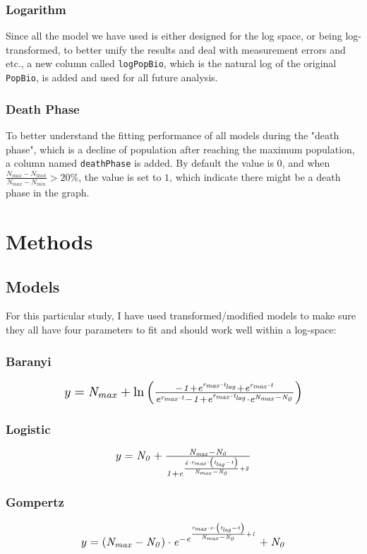 \documentclass[11pt]{article}
\begin{document}
\subsubsection{Logarithm}
Since all the model we have used is either designed for the log space, or being log-transformed, to better unify the results and deal with measurement errors and etc., a new column called \verb|logPopBio|, which is the natural log of the original \verb|PopBio|, is added and used for all future analysis.
\subsubsection{Death Phase}
To better understand the fitting performance of all models during the "death phase", which is a decline of population after reaching the maximum population, a column named \verb|deathPhase| is added. By default the value is $0$, and when $\frac{N_{max} - N_{tlast}}{N_{max}-N_{min}} > 20\% $, the value is set to $1$, which indicate there might be a death phase in the graph.

\section{Methods}
\subsection{Models}
For this particular study, I have used transformed/modified models to make sure they all have four parameters to fit and should work well within a log-space:
\subsubsection{Baranyi}
\begin{equation}
\resizebox{.7\hsize}{!}{$y = \it N_{max}+ \ln\left(
\frac
{-1 + 
e^{r_{max}\cdot t_{lag}}+e^{r_{max}\cdot t}}
{e^{r_{max}\cdot t}-1+e^{r_{max}\cdot t_{lag}}\cdot e^{N_{max}-N_{0}}}
\right)$}\label{eq:Baranyi}
\end{equation}
\subsubsection{Logistic}
\begin{equation}
\resizebox{.4\hsize}{!}{$y = \it N_{0}+\frac {N_{max} - N_{0}}{1+ e^{\frac{4\cdot r_{max}\cdot\left(t_{lag}-t\right)}{N_{max} - N_{0}}+2}}$}\label{eq:Logistic}
\end{equation}
\subsubsection{Gompertz}
\begin{equation}
\resizebox{.6\hsize}{!}{$ y = \it \left(N_{max} - N_{0}\right)\cdot 
e^{-e^{\frac{r_{max}\cdot e \cdot \left(t_{lag} - t\right)}{N_{max} -N_{0}}+1}}+N_{0}$}\label{eq:Gompertz}
\end{equation}
\end{document}
